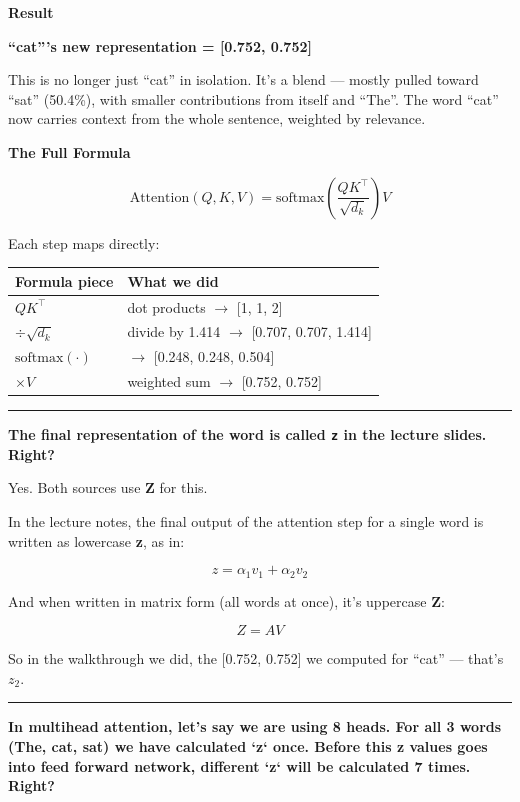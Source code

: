 \medskip
\textbf{Result}

\textbf{``cat'''s new representation = [0.752, 0.752]}

This is no longer just ``cat'' in isolation. It's a blend --- mostly pulled toward ``sat'' (50.4\%), with smaller contributions from itself and ``The''. The word ``cat'' now carries context from the whole sentence, weighted by relevance.

\medskip
\textbf{The Full Formula}

\[
\mathrm{Attention}(Q, K, V) = \mathrm{softmax}\!\left(\frac{QK^\top}{\sqrt{d_k}}\right)V
\]

Each step maps directly:

\begin{center}
\begin{tabular}{ll}
\hline
Formula piece & What we did \\
\hline
$QK^\top$ & dot products $\to$ [1, 1, 2] \\
$\div \sqrt{d_k}$ & divide by 1.414 $\to$ [0.707, 0.707, 1.414] \\
$\mathrm{softmax}(\cdot)$ & $\to$ [0.248, 0.248, 0.504] \\
$\times V$ & weighted sum $\to$ [0.752, 0.752] \\
\hline
\end{tabular}
\end{center}

\bigskip
\hrule
\bigskip

\textbf{The final representation of the word is called \texttt{z} in the lecture slides. Right?}

\medskip

Yes. Both sources use \textbf{Z} for this.

In the lecture notes, the final output of the attention step for a single word is written as lowercase \textbf{z}, as in:

\[
z = \alpha_1 v_1 + \alpha_2 v_2
\]

And when written in matrix form (all words at once), it's uppercase \textbf{Z}:

\[
Z = AV
\]

So in the walkthrough we did, the [0.752, 0.752] we computed for ``cat'' --- that's $z_2$.

\bigskip
\hrule
\bigskip

\textbf{In multihead attention, let's say we are using 8 heads. For all 3 words (The, cat, sat) we have calculated `z` once. Before this z values goes into feed forward network, different `z` will be calculated 7 times. Right?}

